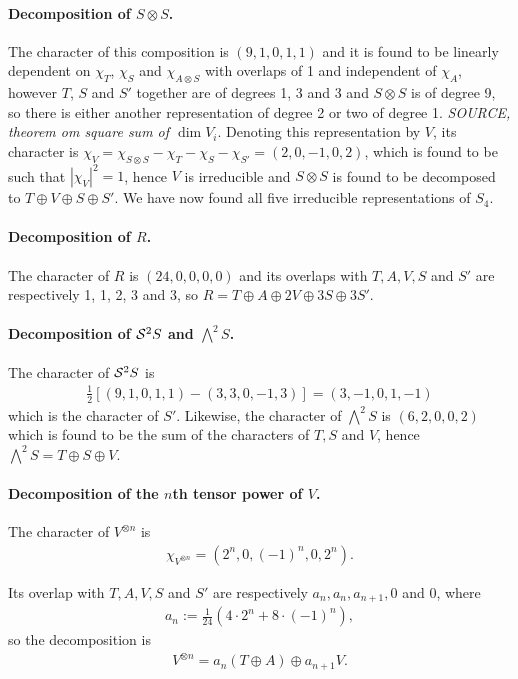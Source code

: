 \paragraph{Decomposition of $S \otimes S$.} The character of this composition is $(9,1,0,1,1)$ and it is found to be linearly dependent on $\chi_T$,  $\chi_S$ and $\chi_{A \otimes S}$ with overlaps of 1 and independent of $\chi_A$, however $T$, $S$ and $S'$ together are of degrees 1, 3 and 3 and $S \otimes S$ is of degree 9, so there is either another representation of degree 2 or two of degree 1. \textit{SOURCE, theorem om square sum of $\dim V_i$}. Denoting this representation by $V$, its character is $\chi_V = \chi_{S \otimes S} - \chi_T - \chi_S - \chi_{S'} = (2, 0, -1, 0, 2)$, which is found to be such that $|\chi_V|^2 = 1$, hence $V$ is irreducible and $S \otimes S$ is found to be decomposed to $T \oplus V \oplus S \oplus S'$. We have now found all five irreducible representations of $S_4$.

\paragraph{Decomposition of $R$.} The character of $R$ is $(24,0,0,0,0)$ and its overlaps with $T, A, V, S$ and $S'$ are respectively 1, 1, 2, 3 and 3, so $R = T \oplus A \oplus 2V \oplus 3S \oplus 3S'$.

\paragraph{Decomposition of $\mathcal{S}^2S$ and $\bigwedge^2S$.} The character of $\mathcal{S}^2S$ is 
\begin{align}
	\frac{1}{2}\left[ (9,1,0,1,1)-(3,3,0,-1,3) \right] = (3,-1,0,1,-1)
\end{align}
which is the character of $S'$. Likewise, the character of $\bigwedge^2S$ is $(6,2,0,0,2)$ which is found to be the sum of the characters of $T, S$ and $V$, hence $\bigwedge^2S = T \oplus S \oplus V$.

\paragraph{Decomposition of the $n$th tensor power of $V$.}

The character of $V^{\otimes n}$ is
\begin{align}
	\chi_{V^{\otimes n}} = (2^n, 0, (-1)^n, 0, 2^n).
\end{align}

Its overlap with $T, A, V, S$ and $S'$ are respectively $a_n, a_n, a_{n+1}, 0$ and $0$, where 
\begin{align}
	a_n := \frac{1}{24}\left( 4 \cdot 2^n + 8 \cdot (-1)^n \right),
\end{align}
so the decomposition is
\begin{align}
	V^{\otimes n} = a_n (T \oplus A) \oplus a_{n+1} V.
\end{align}

